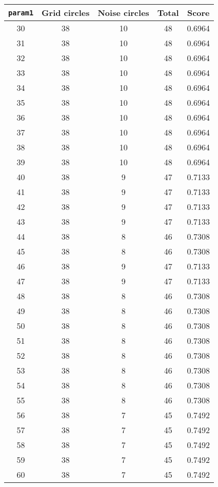 \documentclass[letterpaper, 12pt]{article}
\begin{document}
\begin{longtable}{|c|c|c|c|c|}
\hline
\textbf{\texttt{param1}} & \textbf{Grid circles} & \textbf{Noise circles} & \textbf{Total} & \textbf{Score} \\
\hline
30 & 38 & 10 & 48 & 0.6964 \\
\hline
31 & 38 & 10 & 48 & 0.6964 \\
\hline
32 & 38 & 10 & 48 & 0.6964 \\
\hline
33 & 38 & 10 & 48 & 0.6964 \\
\hline
34 & 38 & 10 & 48 & 0.6964 \\
\hline
35 & 38 & 10 & 48 & 0.6964 \\
\hline
36 & 38 & 10 & 48 & 0.6964 \\
\hline
37 & 38 & 10 & 48 & 0.6964 \\
\hline
38 & 38 & 10 & 48 & 0.6964 \\
\hline
39 & 38 & 10 & 48 & 0.6964 \\
\hline
40 & 38 & 9 & 47 & 0.7133 \\
\hline
41 & 38 & 9 & 47 & 0.7133 \\
\hline
42 & 38 & 9 & 47 & 0.7133 \\
\hline
43 & 38 & 9 & 47 & 0.7133 \\
\hline
44 & 38 & 8 & 46 & 0.7308 \\
\hline
45 & 38 & 8 & 46 & 0.7308 \\
\hline
46 & 38 & 9 & 47 & 0.7133 \\
\hline
47 & 38 & 9 & 47 & 0.7133 \\
\hline
48 & 38 & 8 & 46 & 0.7308 \\
\hline
49 & 38 & 8 & 46 & 0.7308 \\
\hline
50 & 38 & 8 & 46 & 0.7308 \\
\hline
51 & 38 & 8 & 46 & 0.7308 \\
\hline
52 & 38 & 8 & 46 & 0.7308 \\
\hline
53 & 38 & 8 & 46 & 0.7308 \\
\hline
54 & 38 & 8 & 46 & 0.7308 \\
\hline
55 & 38 & 8 & 46 & 0.7308 \\
\hline
56 & 38 & 7 & 45 & 0.7492 \\
\hline
57 & 38 & 7 & 45 & 0.7492 \\
\hline
58 & 38 & 7 & 45 & 0.7492 \\
\hline
59 & 38 & 7 & 45 & 0.7492 \\
\hline
60 & 38 & 7 & 45 & 0.7492 \\
\hline

\end{longtable}
\end{document}
